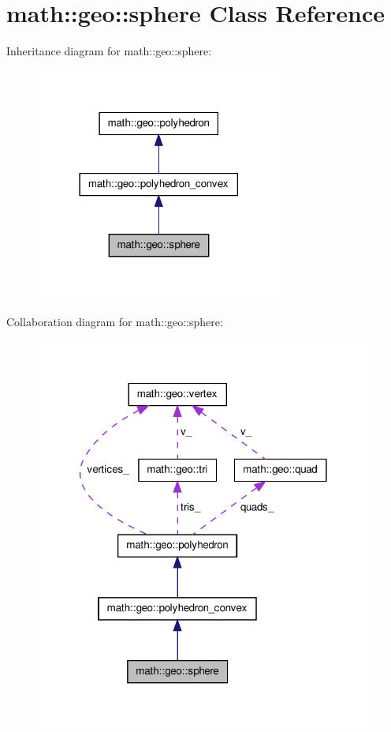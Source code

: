 \hypertarget{classmath_1_1geo_1_1sphere}{\section{math\-:\-:geo\-:\-:sphere \-Class \-Reference}
\label{classmath_1_1geo_1_1sphere}
}


\-Inheritance diagram for math\-:\-:geo\-:\-:sphere\-:
\nopagebreak
\begin{figure}[H]
\begin{center}
\leavevmode
\includegraphics[width=230pt]{classmath_1_1geo_1_1sphere__inherit__graph}
\end{center}
\end{figure}


\-Collaboration diagram for math\-:\-:geo\-:\-:sphere\-:
\nopagebreak
\begin{figure}[H]
\begin{center}
\leavevmode
\includegraphics[width=314pt]{classmath_1_1geo_1_1sphere__coll__graph}
\end{center}
\end{figure}
